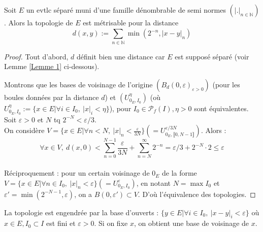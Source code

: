 \begin{propriete}
    Soit $E$ un evtlc séparé muni d'une famille dénombrable de semi normes $(|.|_{n \in \mathbb{N}})$. Alors la topologie de $E$ est métrisable pour la distance $$d(x,y):=\sum\limits_{n\in \mathbb{N} }^{} \min(2^{-n}, |x-y|_n)$$
\end{propriete}
\begin{proof}
    Tout d'abord, $d$ définit bien une distance car $E$ est supposé séparé (voir Lemme \ref{Lemme 1} ci-dessous).
    
    Montrons que les bases de voisinage de l'origine $(B_d(0,\varepsilon )_{\varepsilon >0})$ (pour les boules données par la distance $d$) et $\left(U_{0_E,I_0}^\eta\right)$ (où $U_{0_E,I_0}^\eta := \{x\in E| \forall i\in I_0,\ |x|_i<\eta \}$), pour $I_0 \in \mathcal{P}_f(I),\eta>0$ sont équivalentes.\\
    
    Soit $\varepsilon >0$ et $N$ tq $2^{-N}<\varepsilon /3$.\\
    On considère $V=\{x\in E|\forall n<N,\ |x|_n<\frac{\varepsilon}{3N} \} (= U_{0_E,\llbracket 0, N-1 \rrbracket}^{\varepsilon/3N})$. Alors : 
    $$\forall x\in V,\ d(x,0)<\sum\limits_{n=0}^{N-1} \frac{\varepsilon}{3N}+\sum\limits_{n=N}^{\infty} 2^{-n}=\varepsilon /3+2^{-N} \cdot 2\le \varepsilon $$\\
    Réciproquement : pour un certain voisinage de $0_E$ de la forme $V=\{x\in E|\forall n\in I_0,\ |x|_n<\varepsilon \} (= U_{0_E,I_0}^\varepsilon)$, en notant $N = \max I_0$ et $\varepsilon ' = \min(2^{-N-1},\varepsilon)$, on a $B(0,\varepsilon ' ) \subset V$. D'où l'équivalence des topologies.
    
\end{proof}


La topologie est engendrée par la base d'ouverts : $\{y\in E|\forall i\in I_0,\ |x-y|_i<\varepsilon  \} $ où $x\in E, I_0\subset I$ est fini et $\varepsilon >0$. Si on fixe $x$, on obtient une base de voisinage de $x$.

